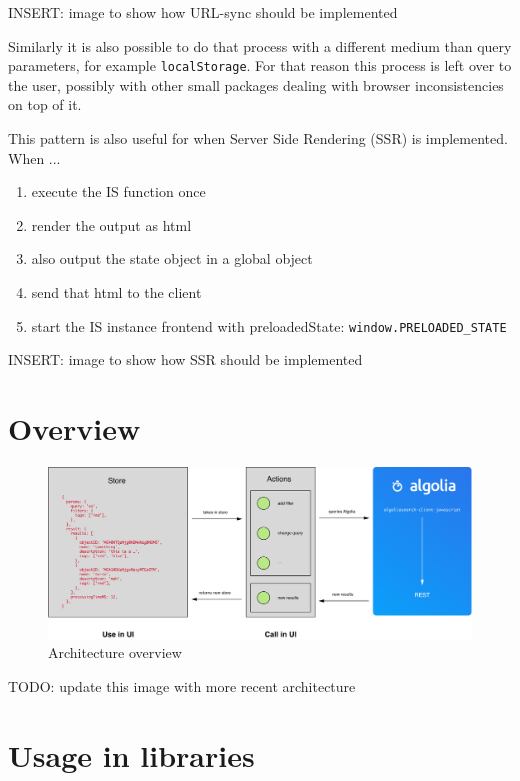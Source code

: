 INSERT: image to show how URL-sync should be implemented

Similarly it is also possible to do that process with a different medium than query parameters, for example {\tt localStorage}. For that reason this process is left over to the user, possibly with other small packages dealing with browser inconsistencies on top of it. 

This pattern is also useful for when Server Side Rendering (SSR) is implemented. When ...

\begin{enumerate}
  \item execute the IS function once
  \item render the output as html
  \item also output the state object in a global object
  \item send that html to the client
  \item start the IS instance frontend with preloadedState: {\tt window.PRELOADED\_STATE}
\end{enumerate}

INSERT: image to show how SSR should be implemented


\section{Overview} %
\label{sec:overview}

\begin{figure}[H]
\label{figure:core-architecture}
  \centering
  \includegraphics[width=\textwidth]{../assets/architecture.pdf}
  \caption{Architecture overview\cite{blog-architecture}}
\end{figure}

TODO: update this image with more recent architecture


\section{Usage in libraries} %
\label{sec:usage_in_libraries}

